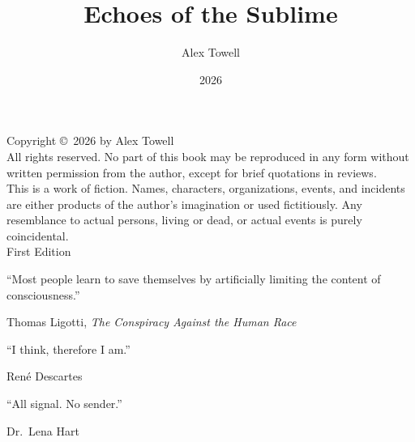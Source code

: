 \documentclass[11pt]{book}
\title{\textbf{Echoes of the Sublime}}
\author{Alex Towell}
\date{2026}
\begin{document}
\frontmatter
\maketitle
\thispagestyle{empty}
\cleardoublepage

\thispagestyle{empty}
\vspace*{\fill}
\begin{center}
Copyright \copyright\ 2026 by Alex Towell\\[1em]
All rights reserved. No part of this book may be reproduced in any form
without written permission from the author, except for brief quotations
in reviews.\\[2em]
This is a work of fiction. Names, characters, organizations, events, and
incidents are either products of the author's imagination or used
fictitiously. Any resemblance to actual persons, living or dead, or
actual events is purely coincidental.\\[2em]
First Edition
\end{center}
\vspace*{\fill}
\cleardoublepage

\thispagestyle{empty}
\vspace*{\fill}
\epigraph{``Most people learn to save themselves by artificially limiting the content of consciousness.''}{Thomas Ligotti, \textit{The Conspiracy Against the Human Race}}
\vspace{1em}
\epigraph{``I think, therefore I am.''}{Ren\'{e} Descartes}
\vspace{1em}
\epigraph{``All signal. No sender.''}{Dr.\ Lena Hart}
\vspace*{\fill}
\cleardoublepage

\tableofcontents
\cleardoublepage

\mainmatter
















\backmatter





\end{document}

